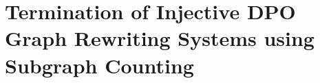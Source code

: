 \documentclass{report}
\begin{document}









\chapter{Termination of Injective DPO Graph Rewriting
Systems using Subgraph Counting}
\label{chap:subgraph_counting}

% 
% 
\end{document}

